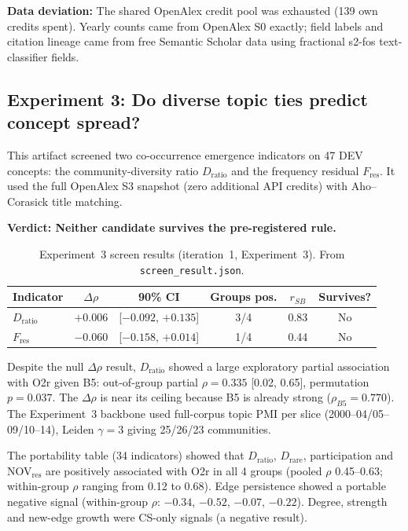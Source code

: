 \documentclass[11pt,letterpaper]{article}
\begin{document}
\textbf{Data deviation:} The shared OpenAlex credit pool was exhausted (139 own credits spent). Yearly counts came from OpenAlex S0 exactly; field labels and citation lineage came from free Semantic Scholar data using fractional s2-fos text-classifier fields.

\subsection{Experiment 3: Do diverse topic ties predict concept spread?}

This artifact screened two co-occurrence emergence indicators on 47 DEV concepts: the community-diversity ratio $D_{\text{ratio}}$ and the frequency residual $F_{\text{res}}$. It used the full OpenAlex S3 snapshot (zero additional API credits) with Aho--Corasick title matching.

\textbf{Verdict: Neither candidate survives the pre-registered rule.}

\begin{table}[!htbp]
\centering
\caption{Experiment~3 screen results (iteration~1, Experiment~3). From \texttt{screen\_result.json}.}
\label{tab:exp3_screen}
\small
\begin{tabular}{lccccc}
\toprule
Indicator & $\Delta\rho$ & 90\% CI & Groups pos. & $r_{SB}$ & Survives? \\
\midrule
$D_{\text{ratio}}$ & $+0.006$ & [$-0.092$, $+0.135$] & 3/4 & 0.83 & No \\
$F_{\text{res}}$ & $-0.060$ & [$-0.158$, $+0.014$] & 1/4 & 0.44 & No \\
\bottomrule
\end{tabular}
\end{table}

Despite the null $\Delta\rho$ result, $D_{\text{ratio}}$ showed a large exploratory partial association with O2r given B5: out-of-group partial $\rho = 0.335$ [0.02, 0.65], permutation $p = 0.037$. The $\Delta\rho$ is near its ceiling because B5 is already strong ($\rho_{B5} = 0.770$). The Experiment~3 backbone used full-corpus topic PMI per slice (2000--04/05--09/10--14), Leiden $\gamma = 3$ giving 25/26/23 communities.

The portability table (34 indicators) showed that $D_{\text{ratio}}$, $D_{\text{rare}}$, participation and NOV$_{\text{res}}$ are positively associated with O2r in all 4 groups (pooled $\rho$ 0.45--0.63; within-group $\rho$ ranging from 0.12 to 0.68). Edge persistence showed a portable negative signal (within-group $\rho$: $-0.34$, $-0.52$, $-0.07$, $-0.22$). Degree, strength and new-edge growth were CS-only signals (a negative result).
\end{document}
